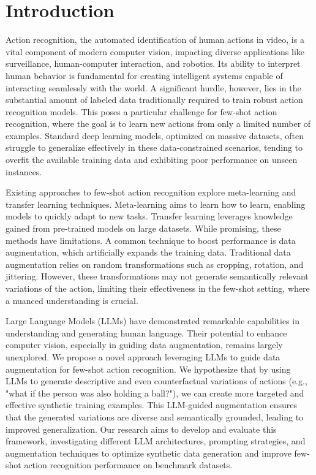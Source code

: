 \section*{Introduction}

Action recognition, the automated identification of human actions in video, is a vital component of modern computer vision, impacting diverse applications like surveillance, human-computer interaction, and robotics. Its ability to interpret human behavior is fundamental for creating intelligent systems capable of interacting seamlessly with the world. A significant hurdle, however, lies in the substantial amount of labeled data traditionally required to train robust action recognition models. This poses a particular challenge for few-shot action recognition, where the goal is to learn new actions from only a limited number of examples. Standard deep learning models, optimized on massive datasets, often struggle to generalize effectively in these data-constrained scenarios, tending to overfit the available training data and exhibiting poor performance on unseen instances.\newline

Existing approaches to few-shot action recognition explore meta-learning and transfer learning techniques. Meta-learning aims to learn how to learn, enabling models to quickly adapt to new tasks. Transfer learning leverages knowledge gained from pre-trained models on large datasets. While promising, these methods have limitations. A common technique to boost performance is data augmentation, which artificially expands the training data. Traditional data augmentation relies on random transformations such as cropping, rotation, and jittering. However, these transformations may not generate semantically relevant variations of the action, limiting their effectiveness in the few-shot setting, where a nuanced understanding is crucial.\newline

Large Language Models (LLMs) have demonstrated remarkable capabilities in understanding and generating human language. Their potential to enhance computer vision, especially in guiding data augmentation, remains largely unexplored. We propose a novel approach leveraging LLMs to guide data augmentation for few-shot action recognition. We hypothesize that by using LLMs to generate descriptive and even counterfactual variations of actions (e.g., "what if the person was also holding a ball?"), we can create more targeted and effective synthetic training examples. This LLM-guided augmentation ensures that the generated variations are diverse and semantically grounded, leading to improved generalization. Our research aims to develop and evaluate this framework, investigating different LLM architectures, prompting strategies, and augmentation techniques to optimize synthetic data generation and improve few-shot action recognition performance on benchmark datasets.\newline
